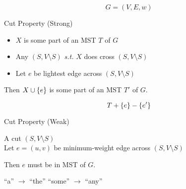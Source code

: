
\begin{frame}{}
  \centerline{}

  \[
    G = (V, E, w)
  \]
\end{frame}

\begin{frame}{}
  \begin{exampleblock}{Cut Property (Strong)}
    \begin{itemize}
      \item $X$ is some part of an MST $T$ of $G$
      \item Any  $(S, V \setminus S)$ \emph{s.t.} $X$ does  cross $(S, V \setminus S)$
     ­\item Let $e$ be  lightest edge across $(S, V \setminus S)$
    \end{itemize}

    \pause
    Then $X \cup \{e\}$ is some part of an MST $T'$ of $G$.
  \end{exampleblock}

  \pause
  \vspace{0.60cm}
  \centerline{}
\end{frame}

\begin{frame}{}
  \centerline{}

  \pause
  \vspace{0.30cm}

  \pause
  \[
    T + \{e\} - \{e'\}
  \]
\end{frame}

\begin{frame}{}
  \begin{exampleblock}{Cut Property (Weak)}
    \begin{center}
      A cut $(S, V \setminus S)$ \\[6pt]
      Let $e = (u,v)$ be  minimum-weight edge across $(S, V \setminus S)$ \\[8pt] \pause

      Then $e$ must be in  MST of $G$.
    \end{center}
  \end{exampleblock}

  \pause

  \pause
  \centerline{``a'' $\to$ ``the'' \red{$\implies$} ``some'' $\to$ ``any''}
\end{frame}

